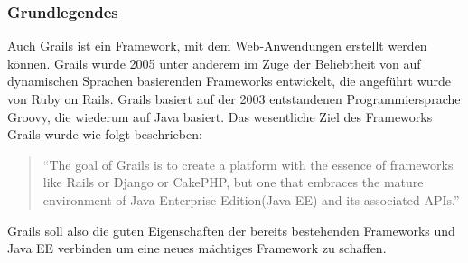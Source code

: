 \subsubsection{Grundlegendes}
Auch Grails ist ein Framework, mit dem Web-Anwendungen erstellt werden können. Grails wurde 2005 unter anderem im Zuge der Beliebtheit von auf dynamischen Sprachen basierenden Frameworks entwickelt, die angeführt wurde von Ruby on Rails. Grails basiert auf der 2003 entstandenen Programmiersprache Groovy, die wiederum auf Java basiert\citep[S.XXV]{DGG2002}\citep[S.3]{GGR2009}. Das wesentliche Ziel des Frameworks Grails wurde wie folgt beschrieben: \begin{quote}\small "`The goal of Grails is to create a platform with the essence of frameworks like Rails or Django or CakePHP, but one that embraces the mature environment of Java Enterprise Edition(Java EE) and its associated APIs."'\citep[S.4]{DGG2002}\end{quote} Grails soll also die guten Eigenschaften der bereits bestehenden Frameworks und Java EE verbinden um eine neues mächtiges Framework zu schaffen.

